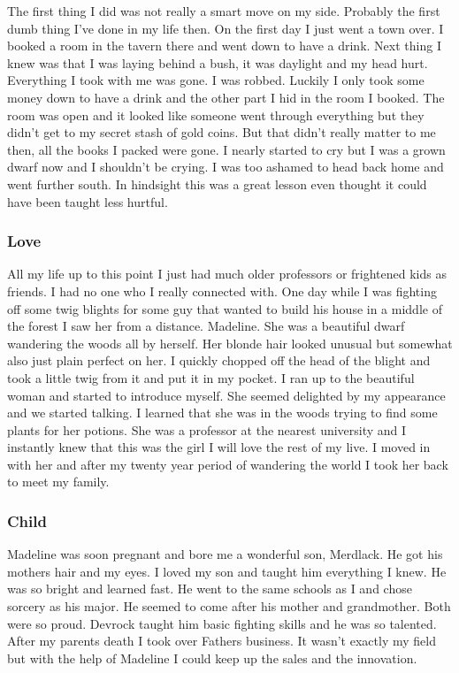 \documentclass[letterpaper,10pt,twoside,twocolumn,openany]{book}
\begin{document}
		The first thing I did was not really a smart move on my side. Probably the first dumb thing I've done in my life then. On the first day I just went a town over. I booked a room in the tavern there and went down to have a drink. Next thing I knew was that I was laying behind a bush, it was daylight and my head hurt. Everything I took with me was gone. I was robbed. Luckily I only took some money down to have a drink and the other part I hid in the room I booked. The room was open and it looked like someone went through everything but they didn't get to my secret stash of gold coins. But that didn't really matter to me then, all the books I packed were gone. I nearly started to cry but I was a grown dwarf now and I shouldn't be crying. I was too ashamed to head back home and went further south. In hindsight this was a great lesson even thought it could have been taught less hurtful. 
		
		\subsubsection{Love}
		All my life up to this point I just had much older professors or frightened kids as friends. I had no one who I really connected with.  One day while I was fighting off some twig blights for some guy that wanted to build his house in a middle of the forest I saw her from a distance. Madeline. She was a beautiful dwarf wandering the woods all by herself. Her blonde hair looked unusual but somewhat also just plain perfect on her. I quickly chopped off the head of the blight and took a little twig from it and put it in my pocket. I ran up to the beautiful woman and started to introduce myself. She seemed delighted by my appearance and we started talking. I learned that she was in the woods trying to find some plants for her potions. She was a professor at the nearest university and I instantly knew that this was the girl I will love the rest of my live. I moved in with her and after my twenty year period of wandering the world I took her back to meet my family. 
		
		\subsubsection{Child}
		Madeline was soon pregnant and bore me a wonderful son, Merdlack. He got his mothers hair and my eyes. I loved my son and taught him everything I knew. He was so bright and learned fast. He went to the same schools as I and chose sorcery as his major. He seemed to come after his mother and grandmother. Both were so proud. Devrock taught him basic fighting skills and he was so talented. After my parents death I took over Fathers business. It wasn't exactly my field but with the help of Madeline I could keep up the sales and the innovation. 
		
\end{document}
